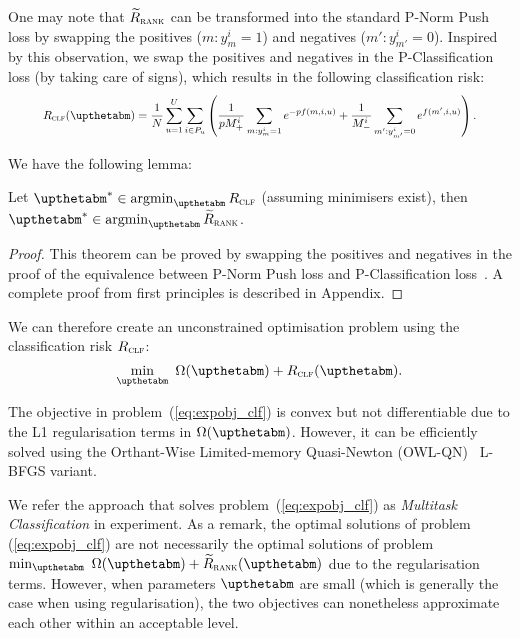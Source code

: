 One may note that $\widetilde R_\textsc{rank}$ can be transformed into the standard P-Norm Push loss by swapping the
positives ($m: y_m^i = 1$) and negatives ($m': y_{m'}^i = 0$). %
Inspired by this observation, we swap the positives and negatives in the P-Classification loss (by taking care of signs),
which results in the following classification risk:
\begin{equation}
\label{eq:clfrisk}
\resizebox{.9\linewidth}{!}{$\displaystyle
R_\textsc{clf}(\upthetabm)
= \frac{1}{N} \sum_{u=1}^U \sum_{i \in P_u} \left(
  \frac{1}{p M_+^i} \sum_{m: y_m^i = 1} e^{-p f(m, i, u)}
  + \frac{1}{M_-^i} \sum_{m': y_{m'}^i = 0} e^{f(m', i, u)} \right).
$}
\end{equation}

We have the following lemma:
\begin{lemma}
\label{lm:rank2clf}
Let $\upthetabm^* \in \argmin_{\upthetabm} R_\textsc{clf}$ (assuming minimisers exist),
then $\upthetabm^* \in \argmin_{\upthetabm} \widetilde R_\textsc{rank}$.
\end{lemma}

\begin{proof}
This theorem can be proved by swapping the positives and negatives in the proof of 
the equivalence between P-Norm Push loss and P-Classification loss~\cite{ertekin2011equivalence}.
A complete proof from first principles is described in Appendix.
\end{proof}

We can therefore create an unconstrained optimisation problem using the classification risk $R_\textsc{clf}$:
\begin{equation}
\label{eq:expobj_clf}
\min_\upthetabm \ \Omega(\upthetabm) + R_\textsc{clf}(\upthetabm).
\end{equation}

The objective in problem~(\ref{eq:expobj_clf}) is convex but not differentiable due to the L1 regularisation terms in $\Omega(\upthetabm)$.
However, it can be efficiently solved using the Orthant-Wise Limited-memory Quasi-Newton (OWL-QN)~\cite{andrew2007scalable} L-BFGS variant.

We refer the approach that solves problem~(\ref{eq:expobj_clf}) as \emph{Multitask Classification} in experiment.
As a remark, the optimal solutions of problem (\ref{eq:expobj_clf}) are not necessarily the optimal solutions 
of problem $\min_\upthetabm \ \Omega(\upthetabm) + \widetilde R_\textsc{rank}(\upthetabm)$ due to the regularisation terms.
However, when parameters $\upthetabm$ are small (which is generally the case when using regularisation), the two objectives 
can nonetheless approximate each other within an acceptable level.


